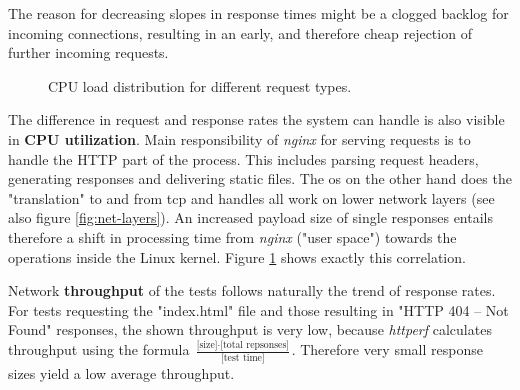 The reason for decreasing slopes in response times might be a clogged backlog for incoming connections, resulting in an early, and therefore cheap rejection of further incoming requests.

\begin{figure}
	\centering
	\caption{CPU load distribution for different request types.}
  \label{fig:initial-req-cpu}
\end{figure}

The difference in request and response rates the system can handle is also visible in \textbf{CPU utilization}. Main responsibility of \textit{nginx} for serving requests is to handle the HTTP part of the process. This includes parsing request headers, generating responses and delivering static files. The \gls{os} on the other hand does the "translation" to and from \gls{tcp} and handles all work on lower network layers (see also figure \ref{fig:net-layers}). An increased payload size of single responses entails therefore a shift in processing time from \textit{nginx} ("user space") towards the operations inside the Linux kernel. Figure \ref{fig:initial-req-cpu} shows exactly this correlation.

\clearpage
Network \textbf{throughput} of the tests follows naturally the trend of response rates. For tests requesting the "index.html" file and those resulting in "HTTP 404 -- Not Found" responses, the shown throughput is very low, because \textit{httperf} calculates throughput using the formula $\frac{\text{[size]} \cdot \text{[total repsonses]}}{\text{[test time]}}$. Therefore very small response sizes yield a low average throughput.

